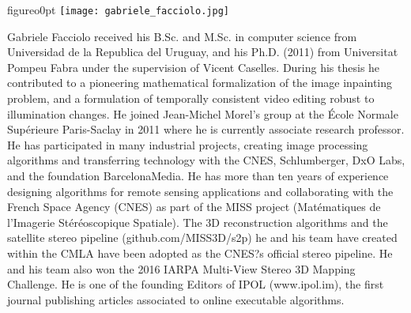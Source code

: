 \begin{wrapfloat}{figure}{o}{0pt}
\texttt{[image: gabriele\_facciolo.jpg]}
\end{wrapfloat}
Gabriele Facciolo received his B.Sc. and M.Sc. in computer science from Universidad de la Republica del Uruguay, and his Ph.D. (2011) from Universitat Pompeu Fabra under the supervision of Vicent Caselles. During his thesis he contributed to a pioneering mathematical formalization of the image inpainting problem, and a formulation of temporally consistent video editing robust to illumination changes. He joined Jean-Michel Morel's group at the \'{E}cole Normale Sup\'erieure Paris-Saclay in 2011 where he is currently associate research professor. He has participated in many industrial projects, creating image processing algorithms and transferring technology with the CNES, Schlumberger, DxO Labs, and the foundation BarcelonaMedia. He has more than ten years of experience designing algorithms for remote sensing applications and collaborating with the French Space Agency (CNES) as part of the MISS project (Mat\'ematiques de l'Imagerie St\'er\'eoscopique Spatiale). The 3D reconstruction algorithms and the satellite stereo pipeline (github.com/MISS3D/s2p) he and his team have created within the CMLA have been adopted as the CNES?s official stereo pipeline. He and his team also won the 2016 IARPA Multi-View Stereo 3D Mapping Challenge. He is one of the founding Editors of IPOL (www.ipol.im), the first journal publishing articles associated to online executable algorithms.\\

